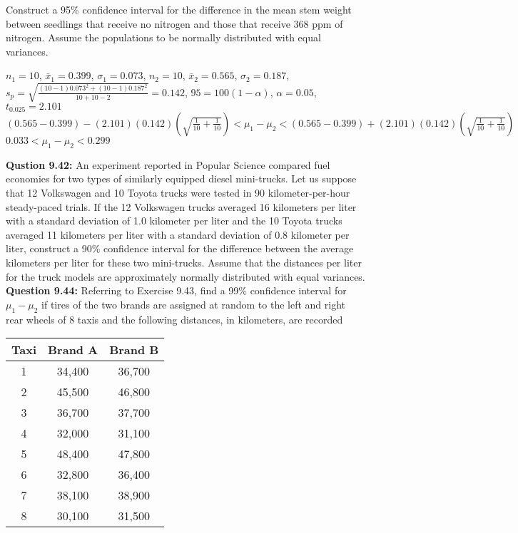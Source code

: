\documentclass{article}
\begin{document}
Construct a 95\% confidence interval for the difference
in the mean stem weight between seedlings that receive 
no nitrogen and those that receive 368 ppm of nitrogen. 
Assume the populations to be normally distributed with 
equal variances.
\begin{description}
    \item $n_1=10$, $\bar{x}_1=0.399$, $\sigma_1=0.073$, $n_2=10$, $\bar{x}_2=0.565$, 
    $\sigma_2=0.187$, $s_p=\sqrt{\frac{(10-1)0.073^2+(10-1)0.187^2}{10+10-2}}=0.142$, 
    $95=100(1-\alpha)$, $\alpha=0.05$, $t_{0.025}=2.101$\\
    $(0.565-0.399)-(2.101)(0.142)(\sqrt{\frac{1}{10}+\frac{1}{10}}) < \mu_1-\mu_2 <
    (0.565-0.399)+(2.101)(0.142)(\sqrt{\frac{1}{10}+\frac{1}{10}})$\\
    \boldmath$0.033 < \mu_1 - \mu_2 < 0.299$
\end{description}
\textbf{Qustion 9.42:}
An experiment reported in Popular Science
compared fuel economies for two types of similarly
equipped diesel mini-trucks. Let us suppose that 12
Volkswagen and 10 Toyota trucks were tested in 90 
kilometer-per-hour steady-paced trials. If the 12 
Volkswagen trucks averaged 16 kilometers per liter with a
standard deviation of 1.0 kilometer per liter and the 10
Toyota trucks averaged 11 kilometers per liter with a
standard deviation of 0.8 kilometer per liter, construct
a 90\% confidence interval for the difference between the
average kilometers per liter for these two mini-trucks.
Assume that the distances per liter for the truck models 
are approximately normally distributed with equal
variances.\\\newline
\textbf{Question 9.44:}
Referring to Exercise 9.43, find a 99\% confidence
interval for $\mu_1 - \mu_2$ if tires of the two brands are 
assigned at random to the left and right rear wheels of
8 taxis and the following distances, in kilometers, are
recorded
\begin{center}
    \begin{tabular}{c c c}
        Taxi  & Brand A & Brand B\\
        \hline
        1 & 34,400 & 36,700 \\
        2 & 45,500 & 46,800 \\
        3 & 36,700 & 37,700 \\
        4 & 32,000 & 31,100 \\
        5 & 48,400 & 47,800 \\
        6 & 32,800 & 36,400 \\
        7 & 38,100 & 38,900 \\
        8 & 30,100 & 31,500 \\
    \end{tabular}
\end{center}
\end{document}

